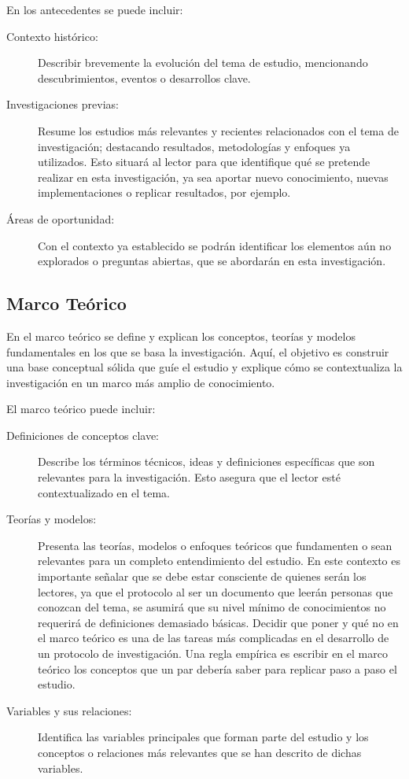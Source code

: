 \documentclass[12pt,letterpaper,spanish, twoside]{article}
\begin{document}
En los antecedentes se puede incluir:
\begin{description}
    \item[Contexto histórico:] Describir brevemente la evolución del tema de estudio, mencionando descubrimientos, eventos o desarrollos clave.
    \item[Investigaciones previas:] Resume los estudios más relevantes y recientes relacionados con el tema de investigación; destacando resultados, metodologías y enfoques ya utilizados. Esto situará al lector para que identifique qué se pretende realizar en esta investigación, ya sea aportar nuevo conocimiento, nuevas implementaciones o replicar resultados, por ejemplo.
    \item[Áreas de oportunidad:] Con el contexto ya establecido se podrán identificar los elementos aún no explorados o preguntas abiertas, que se abordarán en esta investigación.
\end{description}


\subsection{Marco Teórico}
En el marco teórico se define y explican los conceptos, teorías y modelos fundamentales en los que se basa la investigación. Aquí, el objetivo es construir una base conceptual sólida que guíe el estudio y explique cómo se contextualiza la investigación en un marco más amplio de conocimiento.

El marco teórico puede incluir:
\begin{description}
    \item[Definiciones de conceptos clave:] Describe los términos técnicos, ideas y definiciones específicas que son relevantes para la investigación. Esto asegura que el lector esté contextualizado en el tema.
    \item[Teorías y modelos:] Presenta las teorías, modelos o enfoques teóricos que fundamenten o sean relevantes para un completo entendimiento del estudio. En este contexto es importante señalar que se debe estar consciente de quienes serán los lectores, ya que el protocolo al ser un documento que leerán personas que conozcan del tema, se asumirá que su nivel mínimo de conocimientos no requerirá de definiciones demasiado básicas. Decidir que poner y qué no en el marco teórico es una de las tareas más complicadas en el desarrollo de un protocolo de investigación. Una regla empírica es escribir en el marco teórico los conceptos que un par debería saber para replicar paso a paso el estudio.
    \item[Variables y sus relaciones:] Identifica las variables principales que forman parte del estudio y los conceptos o relaciones más relevantes que se han descrito de dichas variables.
\end{description}
\end{document}
